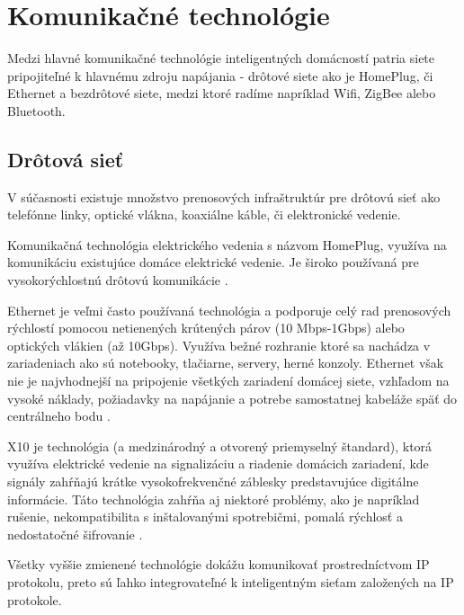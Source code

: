 \documentclass[twoside]{ctuthesis}
\theoremstyle{plain}
\theoremstyle{definition}
\theoremstyle{note}
\begin{document}
\section{Komunikačné technológie}

Medzi hlavné komunikačné technológie inteligentných domácností patria siete pripojiteľné k hlavnému zdroju napájania - drôtové siete ako je HomePlug, či Ethernet a bezdrôtové siete, medzi ktoré radíme napríklad Wifi, ZigBee alebo Bluetooth.

\subsection{Drôtová sieť }

V súčasnosti existuje množstvo prenosových infraštruktúr pre drôtovú sieť ako telefónne linky, optické vlákna, koaxiálne káble, či elektronické vedenie.
\newline

Komunikačná technológia elektrického vedenia s názvom HomePlug, využíva na komunikáciu  existujúce domáce elektrické vedenie. Je široko používaná pre vysokorýchlostnú
drôtovú komunikácie \cite{comunication}.
\newline

Ethernet je veľmi často používaná technológia a podporuje celý rad prenosových rýchlostí pomocou netienených krútených párov (10 Mbps-1Gbps) alebo optických vlákien (až 10Gbps). Využíva bežné rozhranie ktoré sa nachádza v zariadeniach ako sú notebooky, tlačiarne, servery, herné konzoly. Ethernet však nie je najvhodnejší na pripojenie všetkých zariadení domácej siete, vzhľadom na vysoké náklady, požiadavky na napájanie a potrebe samostatnej kabeláže späť do centrálneho bodu \cite{comunication}. 
\newline

X10 je technológia (a medzinárodný a otvorený priemyselný štandard), ktorá využíva elektrické vedenie na signalizáciu a riadenie domácich zariadení, kde signály zahŕňajú krátke vysokofrekvenčné záblesky predstavujúce digitálne informácie. Táto technológia zahŕňa aj niektoré problémy, ako je napríklad rušenie, nekompatibilita s inštalovanými spotrebičmi, pomalá rýchlosť a nedostatočné šifrovanie \cite{comunication}.
\newline

Všetky vyššie zmienené technológie dokážu komunikovať prostredníctvom IP protokolu, preto sú ľahko integrovateľné k inteligentným sieťam založených na IP protokole.
\newline
\end{document}
